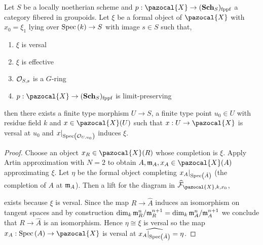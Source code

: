\documentclass[12pt]{article}
\newcommand{\fppf}{\mathrm{fppf}}
\renewcommand{\X}{\pazocal{X}}
\renewcommand{\F}{\mathcal{F}}
\begin{document}
\begin{lemma}
Let $S$ be a locally noetherian scheme and $p : \X \to (\Sch_S)_{\fppf}$ a category fibered in groupoids. Let $\xi$ be a formal object of $\X$ with $x_0 = \xi_1$ lying over $\mathrm{Spec}\left( k \right) \to S$ with image $s \in S$ such that,
\begin{enumerate}
\item $\xi$ is versal
\item $\xi$ is effective
\item $\mathcal{O}_{S, s}$ is a $G$-ring 
\item $p : \X \to (\Sch_S)_{\fppf}$ is limit-preserving
\end{enumerate}
then there exists a finite type morphism $U \to S$, a finite type point $u_0 \in U$ with residue field $k$ and $x \in \X(U)$ such that $x : U \to \X$ is versal at $u_0$ and $x|_{\mathrm{Spec}\left( \mathcal{O}_{U, u_0} \right)}$ induces $\xi$. 
\end{lemma}

\begin{proof}
Choose an object $x_R \in \X(R)$ whose completion is $\xi$. Apply Artin approximation with $N = 2$ to obtain $A, \m_A, x_A \in \X(A)$ approximating $\xi$. Let $\eta$ be the formal object completing $x_A |_{\mathrm{Spec}\left( \hat{A} \right)}$ (the completion of $A$ at $\mathfrak{m}_A$). Then a lift for the diagram in $\wh{\F}_{\X, k, x_0}$,
\begin{center}
\quad {} \quad
{}
\end{center}
exists because $\xi$ is versal. Since the map $R \to \hat{A}$ induces an isomorphism on tangent spaces and by construction $\dim_k \mathfrak{m}_R^n / \mathfrak{m}_R^{n+1} = \dim_k \mathfrak{m}_A^n / \mathfrak{m}_A^{n+1}$ we conclude that $R \to \hat{A}$ is an isomorphism. Hence $\eta \cong \xi$ is versal so the map $x_A : \Spec{A} \to \X$ is versal at $\widehat{x_A|_{\mathrm{Spec}\left( \hat{A} \right)}}  = \eta$. 
\end{proof}
\end{document}
